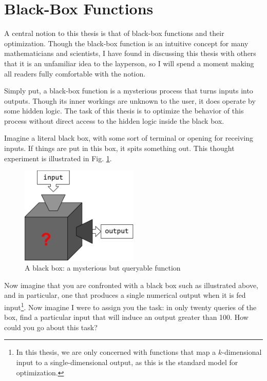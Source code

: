 \section{Black-Box Functions}
A central notion to this thesis is that of black-box functions and their optimization. Though the black-box function is an intuitive concept for many mathematicians and scientists, I have found in discussing this thesis with others that it is an unfamiliar idea to the layperson, so I will spend a moment making all readers fully comfortable with the notion.

Simply put, a black-box function is a mysterious process that turns inputs into outputs. Though its inner workings are unknown to the user, it does operate by some hidden logic. The task of this thesis is to optimize the behavior of this process without direct access to the hidden logic inside the black box.

Imagine a literal black box, with some sort of terminal or opening for receiving inputs. If things are put in this box, it spits something out. This thought experiment is illustrated in Fig. \ref{fig:black_box}.

\begin{figure}[h]
	\centering
	\includegraphics[width=0.5\textwidth]{images/blackbox}
	\caption{A black box: a mysterious but queryable function}
	\label{fig:black_box}

\end{figure}

Now imagine that you are confronted with a black box such as illustrated above, and in particular, one that produces a single numerical output when it is fed input\footnote{In this thesis, we are only concerned with functions that map a $k$-dimensional input to a single-dimensional output, as this is the standard model for optimization.}. Now imagine I were to assign you the task: in only twenty queries of the box, find a particular input that will induce an output greater than 100. How could you go about this task?

